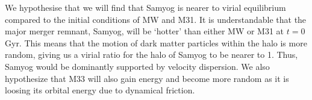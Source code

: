 \documentclass[twocolumn]{aastex631}
\begin{document}
We hypothesise that we will find that Samyog is nearer to virial equilibrium compared to the initial conditions of MW and M31. It is understandable that the major merger remnant, Samyog, will be `hotter' than either MW or M31 at $t=0$ Gyr. This means that the motion of dark matter particles within the halo is more random, giving us a virial ratio for the halo of Samyog to be nearer to 1. Thus, Samyog would be dominantly supported by velocity dispersion. We also hypothesize that M33 will also gain energy and become more random as it is loosing its orbital energy due to dynamical friction. 




\end{document}
